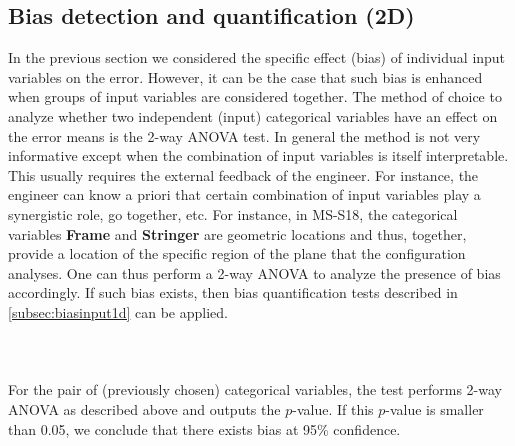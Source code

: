 \subsection{Bias detection and quantification (2D)}
In the previous section we considered the specific effect (bias) of individual input variables on the error. However, it can be the case that such bias is enhanced when groups of input variables are considered together. 
The method of choice to analyze whether two independent (input) categorical variables have an effect on the error means is the 2-way ANOVA test\cite{fujikoshi1993two}.
In general the method is not very informative except when the combination of input variables is itself interpretable. This usually requires the external feedback of the engineer. For instance, the engineer can know a priori that certain combination of input variables play a synergistic role, go together, etc.
For instance, in MS-S18, the categorical variables \textbf{Frame} and \textbf{Stringer} are geometric locations and thus, together, provide a location of the specific region of the plane that the configuration analyses. One can thus perform a 2-way ANOVA to analyze the presence of bias accordingly. If such bias exists, then bias quantification tests described in \autoref{subsec:biasinput1d} can be applied.\\
%
\paragraph{ \\}
For the pair of (previously chosen) categorical variables, the test performs 2-way ANOVA as described above and outputs the $p$-value. If this $p$-value is smaller than 0.05, we conclude that there exists bias at 95\% confidence.\\

